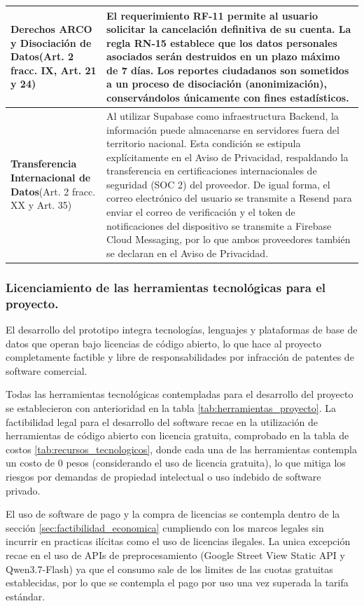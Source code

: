 \begin{longtable}{|>{\raggedright\arraybackslash}p{}|>{\raggedright\arraybackslash}p{}|}
\textbf{Derechos ARCO y Disociación de Datos}\newline (Art. 2 fracc. IX, Art. 21 y 24) & El requerimiento RF-11 permite al usuario solicitar la cancelación definitiva de su cuenta. La regla RN-15 establece que los datos personales asociados serán destruidos en un plazo máximo de 7 días. Los reportes ciudadanos son sometidos a un proceso de disociación (anonimización), conservándolos únicamente con fines estadísticos. \\ \hline

\textbf{Transferencia Internacional de Datos}\newline (Art. 2 fracc. XX y Art. 35) & Al utilizar Supabase como infraestructura Backend, la información puede almacenarse en servidores fuera del territorio nacional. Esta condición se estipula explícitamente en el Aviso de Privacidad, respaldando la transferencia en certificaciones internacionales de seguridad (SOC 2) del proveedor. De igual forma, el correo electrónico del usuario se transmite a Resend para enviar el correo de verificación y el token de notificaciones del dispositivo se transmite a Firebase Cloud Messaging, por lo que ambos proveedores también se declaran en el Aviso de Privacidad. \\ \hline
\end{longtable}

\subsubsection{Licenciamiento de las herramientas tecnológicas para el proyecto.}

El desarrollo del prototipo integra tecnologías, lenguajes y plataformas de base de datos que operan bajo licencias de código abierto, lo que hace al proyecto completamente factible y libre de responsabilidades por infracción de patentes de software comercial.

Todas las herramientas tecnológicas contempladas para el desarrollo del proyecto se establecieron con anterioridad en la tabla \ref{tab:herramientas_proyecto}. La factibilidad legal para el desarrollo del software recae en la utilización de herramientas de código abierto con licencia gratuita, comprobado en la tabla de costos \ref{tab:recursos_tecnologicos}, donde cada una de las herramientas contempla un costo de 0 pesos (considerando el uso de licencia gratuita), lo que mitiga los riesgos por demandas de propiedad intelectual o uso indebido de software privado.    

El uso de software de pago y la compra de licencias se contempla dentro de la sección \ref{sec:factibilidad_economica} cumpliendo con los marcos legales sin incurrir en practicas ilícitas como el uso de licencias ilegales. La unica excepción recae en el uso de APIs de preprocesamiento (Google Street View Static API y Qwen3.7-Flash) ya que el consumo  sale de los limites de las cuotas gratuitas establecidas, por lo que se contempla el pago por uso una vez superada la tarifa estándar.  

